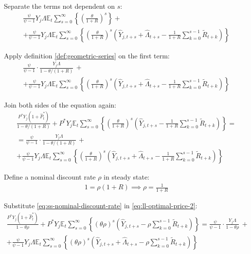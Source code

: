 \documentclass[
	12pt, 
	]{article}
\numberwithin{equation}{section}
\newcommand{\E}[1][t]{{\mathbb{E}_{#1}}}
\theoremstyle{definition}
\theoremstyle{plain}
\theoremstyle{plain}
\theoremstyle{plain}
\begin{document}
Separate the terms not dependent on $s$:
\begin{multline}
	\frac{\psi}{\psi-1} Y_{j} \Lambda \E \sum_{s=0}^{\infty} \left\{ \left( \frac{\theta}{1 + R} \right)^s \right\} + 
\\
	+ \frac{\psi}{\psi-1} Y_{j} \Lambda \E \sum_{s=0}^{\infty} \left\{ \left( \frac{\theta}{1 + R} \right)^s \left( \hat{Y}_{j,t+s} + \hat{\Lambda}_{t+s} - \frac{1}{1 + R} \sum_{k=0}^{s-1} \widetilde{R}_{t+k} \right) \right\} \nonumber
\end{multline}

Apply definition \ref{def:geometric-series} on the first term:
\begin{multline}
	\frac{\psi}{\psi-1} \cdot \frac{Y_{j} \Lambda}{1-\theta /(1+R)} \, + 
	\\
	+ \frac{\psi}{\psi-1} Y_{j} \Lambda \E \sum_{s=0}^{\infty} \left\{ \left( \frac{\theta}{1 + R} \right)^s \left( \hat{Y}_{j,t+s} + \hat{\Lambda}_{t+s} - \frac{1}{1 + R} \sum_{k=0}^{s-1} \widetilde{R}_{t+k} \right) \right\} \nonumber
\end{multline}

Join both sides of the equation again:
\begin{multline}
	\frac{ P^\ast Y_{j} ( 1 + \hat{P}_t^\ast ) }{1-\theta /(1+R)} + P^\ast Y_{j} \E \sum_{s=0}^{\infty} \left\{ \left( \frac{\theta}{1 + R} \right)^s \left( \hat{Y}_{j,t+s} - \frac{1}{1 + R} \sum_{k=0}^{s-1} \widetilde{R}_{t+k} \right) \right\} = 
\\
	= \frac{\psi}{\psi-1} \cdot \frac{Y_{j} \Lambda}{1-\theta /(1+R)} \, + 
\\
	+ \frac{\psi}{\psi-1} Y_{j} \Lambda \E \sum_{s=0}^{\infty} \left\{ \left( \frac{\theta}{1 + R} \right)^s \left( \hat{Y}_{j,t+s} + \hat{\Lambda}_{t+s} - \frac{1}{1 + R} \sum_{k=0}^{s-1} \widetilde{R}_{t+k} \right) \right\} \label{eq:ll-optimal-price-2}
\end{multline}

Define a nominal discount rate $\rho$ in steady state:
\begin{align}
	1 = \rho (1 + R) \implies \rho = \frac{1}{1 + R} \label{eq:ss-nominal-discount-rate}
\end{align}

Substitute \ref{eq:ss-nominal-discount-rate} in \ref{eq:ll-optimal-price-2}:
\begin{multline}
	\frac{ P^\ast Y_{j} ( 1 + \hat{P}_t^\ast ) }{1- \theta \rho} + P^\ast Y_{j} \E \sum_{s=0}^{\infty} \left\{ \left( \theta \rho \right)^s \left( \hat{Y}_{j,t+s} - \rho \sum_{k=0}^{s-1} \widetilde{R}_{t+k} \right) \right\} = \frac{\psi}{\psi-1} \cdot \frac{Y_{j} \Lambda}{1- \theta \rho } \, + 
\\ 
	+ \frac{\psi}{\psi-1} Y_{j} \Lambda \E \sum_{s=0}^{\infty} \left\{ \left( \theta \rho \right)^s \left( \hat{Y}_{j,t+s} + \hat{\Lambda}_{t+s} - \rho \sum_{k=0}^{s-1} \widetilde{R}_{t+k} \right) \right\} \label{eq:ll-optimal-price-3}
\end{multline}
\end{document}
